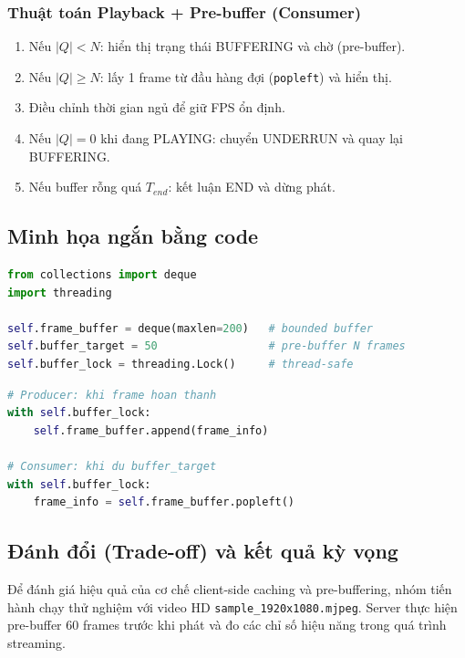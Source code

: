 \subsubsection{Thuật toán Playback + Pre-buffer (Consumer)}
\begin{enumerate}
    \item Nếu $|Q| < N$: hiển thị trạng thái BUFFERING và chờ (pre-buffer).
    \item Nếu $|Q| \ge N$: lấy 1 frame từ đầu hàng đợi (\texttt{popleft}) và hiển thị.
    \item Điều chỉnh thời gian ngủ để giữ FPS ổn định.
    \item Nếu $|Q|=0$ khi đang PLAYING: chuyển UNDERRUN và quay lại BUFFERING.
    \item Nếu buffer rỗng quá $T_{end}$: kết luận END và dừng phát.
\end{enumerate}

\subsection{Minh họa ngắn bằng code}
\begin{lstlisting}[language=Python, caption={Khởi tạo buffer và đồng bộ truy cập}]
from collections import deque
import threading

self.frame_buffer = deque(maxlen=200)   # bounded buffer
self.buffer_target = 50                 # pre-buffer N frames
self.buffer_lock = threading.Lock()     # thread-safe
\end{lstlisting}

\begin{lstlisting}[language=Python, caption={Nguyên tắc producer/consumer}]
# Producer: khi frame hoan thanh
with self.buffer_lock:
    self.frame_buffer.append(frame_info)

# Consumer: khi du buffer_target
with self.buffer_lock:
    frame_info = self.frame_buffer.popleft()
\end{lstlisting}


\subsection{Đánh đổi (Trade-off) và kết quả kỳ vọng}
Để đánh giá hiệu quả của cơ chế client-side caching và pre-buffering,
nhóm tiến hành chạy thử nghiệm với video HD \texttt{sample\_1920x1080.mjpeg}.
Server thực hiện pre-buffer 60 frames trước khi phát và đo các chỉ số
hiệu năng trong quá trình streaming.

